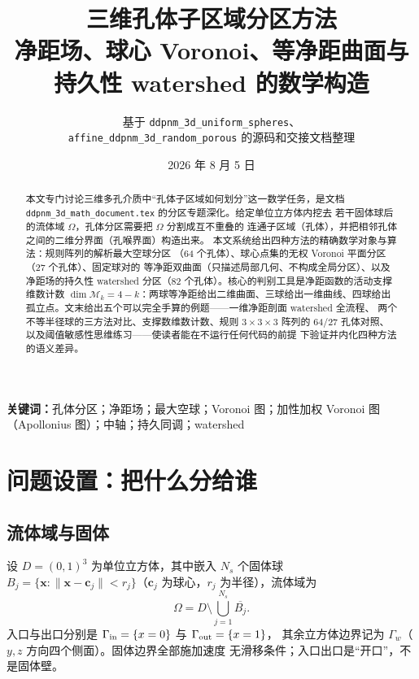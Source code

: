 \documentclass[UTF8,zihao=-4]{ctexart}
\title{\bfseries\LARGE 三维孔体子区域分区方法\\[0.5em]
\Large 净距场、球心 Voronoi、等净距曲面与持久性 watershed 的数学构造}
\author{基于 \texttt{ddpnm\_3d\_uniform\_spheres}、\\
\texttt{affine\_ddpnm\_3d\_random\_porous} 的源码和交接文档整理}
\date{2026 年 8 月 5 日}
\newcommand{\cc}{\bm c}
\begin{document}
\maketitle

\begin{abstract}
本文专门讨论三维多孔介质中``孔体子区域如何划分''这一数学任务，是文档
\texttt{ddpnm\_3d\_math\_document.tex} 的分区专题深化。给定单位立方体内挖去
若干固体球后的流体域 $\Omega$，孔体分区需要把 $\Omega$ 分割成互不重叠的
连通子区域（孔体），并把相邻孔体之间的二维分界面（孔喉界面）构造出来。
本文系统给出四种方法的精确数学对象与算法：规则阵列的解析最大空球分区
（64 个孔体）、球心点集的无权 Voronoi 平面分区（27 个孔体）、固定球对的
等净距双曲面（只描述局部几何、不构成全局分区）、以及净距场的持久性
watershed 分区（82 个孔体）。核心的判别工具是净距函数的活动支撑维数计数
$\dim\mathcal M_k=4-k$：两球等净距给出二维曲面、三球给出一维曲线、四球给出
孤立点。文末给出五个可以完全手算的例题——一维净距剖面 watershed 全流程、
两个不等半径球的三方法对比、支撑数维数计数、规则 $3\times3\times3$ 阵列的
64/27 孔体对照、以及阈值敏感性思维练习——使读者能在不运行任何代码的前提
下验证并内化四种方法的语义差异。
\end{abstract}

\noindent\textbf{关键词：}孔体分区；净距场；最大空球；Voronoi 图；加性加权
Voronoi 图（Apollonius 图）；中轴；持久同调；watershed

\clearpage
{\footnotesize\tableofcontents}
\clearpage

\section{问题设置：把什么分给谁}

\subsection{流体域与固体}

设 $D=(0,1)^3$ 为单位立方体，其中嵌入 $N_s$ 个固体球
$B_j=\{\bm x:\|\bm x-\cc_j\|<r_j\}$（$\cc_j$ 为球心，$r_j$ 为半径），流体域为
\begin{equation}
  \Omega=D\setminus\bigcup_{j=1}^{N_s}\overline{B_j}.
\end{equation}
入口与出口分别是 $\Gamma_{\rm in}=\{x=0\}$ 与 $\Gamma_{\rm out}=\{x=1\}$，
其余立方体边界记为 $\Gamma_w$（$y,z$ 方向四个侧面）。固体边界全部施加速度
无滑移条件；入口出口是``开口''，不是固体壁。
\end{document}
